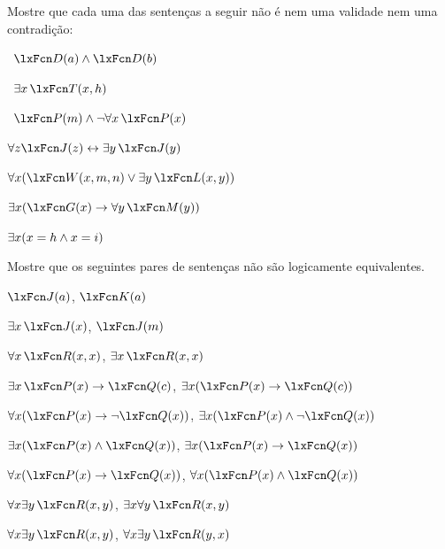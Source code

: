 \solutions
\problempart
\label{pr.Contingent}
Mostre que cada uma das sentenças a seguir não é nem uma validade nem uma contradição:
\begin{compactlist}
\item \leftsolutions\ $\atom{D}{a}  \eand \atom{D}{b}$
\item \leftsolutions\ $\exists x\, \atom{T}{x,h}$
\item \leftsolutions\ $\atom{P}{m}  \eand \enot\forall x\, \atom{P}{x}$
\item $\forall z \atom{J}{z} \eiff \exists y\, \atom{J}{y}$
\item $\forall x (\atom{W}{x,m,n} \eor \exists y\,\atom{L}{x,y})$
\item $\exists x (\atom{G}{x} \eif \forall y\, \atom{M}{y})$
\item $\exists x (x = h \wedge x = i)$
\end{compactlist}

\solutions
\problempart
\label{pr.NotEquiv}
Mostre que os seguintes pares de sentenças não são logicamente equivalentes.
\begin{compactlist}
\item $\atom{J}{a} $,  $\atom{K}{a}$
\item $\exists x\, \atom{J}{x}$,  $\atom{J}{m}$
\item $\forall x\, \atom{R}{x,x}$, $\exists x\, \atom{R}{x,x}$
\item $\exists x\, \atom{P}{x} \eif \atom{Q}{c}$, $\exists x (\atom{P}{x} \eif \atom{Q}{c})$
\item $\forall x(\atom{P}{x} \eif \enot \atom{Q}{x})$, $\exists x(\atom{P}{x} \eand \enot \atom{Q}{x})$
\item $\exists x(\atom{P}{x} \eand \atom{Q}{x})$, $\exists x(\atom{P}{x} \eif \atom{Q}{x})$
\item $\forall x(\atom{P}{x}\eif \atom{Q}{x})$, $\forall x(\atom{P}{x} \eand \atom{Q}{x})$
\item $\forall x\exists y\, \atom{R}{x,y}$, $\exists x\forall y\, \atom{R}{x,y}$
\item $\forall x\exists y\, \atom{R}{x,y}$, $\forall x\exists y\, \atom{R}{y,x}$
\end{compactlist}



